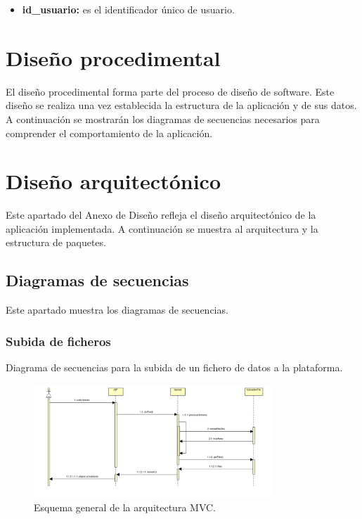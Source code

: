 \begin{itemize}
	\item \textbf{id\_usuario:} es el identificador único de usuario.
\end{itemize}

\section{Diseño procedimental}

El diseño procedimental forma parte del proceso de diseño de software. Este diseño se realiza una vez establecida la estructura de la aplicación y de sus datos.
A continuación se mostrarán los diagramas de secuencias necesarios para comprender el comportamiento de la aplicación.

\section{Diseño arquitectónico}
Este apartado del Anexo de Diseño refleja el diseño arquitectónico de la aplicación implementada. A continuación se muestra al arquitectura y la estructura de paquetes.


\subsection{Diagramas de secuencias}
Este apartado muestra los diagramas de secuencias.

\subsubsection{Subida de ficheros}
Diagrama de secuencias para la subida de un fichero de datos a la plataforma.
\begin{figure}[!htbp]
  \centering
    \includegraphics[width=0.8\textwidth]{../img/diagramas/secuencias/4.jpg}
  \caption{Esquema general de la arquitectura MVC.}
  \label{mvc}
\end{figure}

